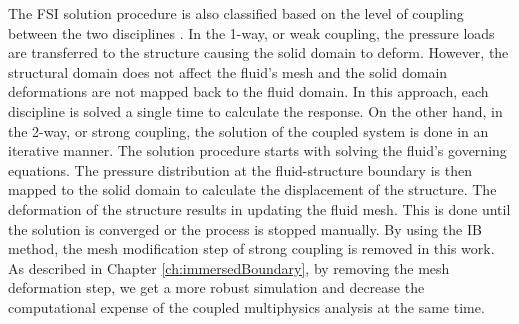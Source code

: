 The FSI solution procedure is also classified based on the level of coupling between the two disciplines \cite{hu2001direct}. In the 1-way, or weak coupling, the pressure loads are transferred to the structure causing the solid domain to deform. However, the structural domain does not affect the fluid's mesh and the solid domain deformations are not mapped back to the fluid domain. In this approach, each discipline is solved a single time to calculate the response. On the other hand, in the 2-way, or strong coupling, the solution of the coupled system is done in an iterative manner. The solution procedure starts with solving the fluid's governing equations. The pressure distribution at the fluid-structure boundary is then mapped to the solid domain to calculate the displacement of the structure. The deformation of the structure results in updating the fluid mesh. This is done until the solution is converged or the process is stopped manually. By using the IB method, the mesh modification step of strong coupling is removed in this work. As described in Chapter \ref{ch:immersedBoundary}, by removing the mesh deformation step, we get a more robust simulation and decrease the computational expense of the coupled multiphysics analysis at the same time.
